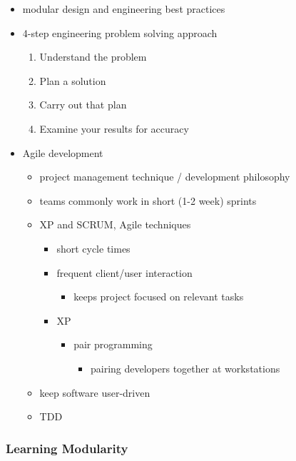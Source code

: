 \documentclass[11pt]{article}
\begin{document}
\begin{itemize}
\begin{itemize}
\item modular design and engineering best practices
\item 4-step engineering problem solving approach
\begin{enumerate}
\item Understand the problem
\item Plan a solution
\item Carry out that plan
\item Examine your results for accuracy
\end{enumerate}
\item Agile development
\begin{itemize}
\item project management technique / development philosophy
\item teams commonly work in short (1-2 week) sprints
\item XP and SCRUM, Agile techniques
\begin{itemize}
\item short cycle times
\item frequent client/user interaction
\begin{itemize}
\item keeps project focused on relevant tasks
\end{itemize}
\item XP
\begin{itemize}
\item pair programming
\begin{itemize}
\item pairing developers together at workstations
\end{itemize}
\end{itemize}
\end{itemize}
\item keep software user-driven
\item TDD
\end{itemize}
\end{itemize}
\end{itemize}

\subsubsection{Learning Modularity}
\label{sec-2-2-1}
\end{document}
